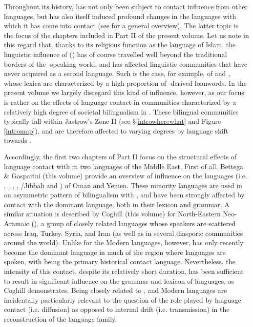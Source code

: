 \documentclass[output=paper]{langsci/langscibook}
\begin{document}
Throughout its history,  has not only been subject to contact influence from other languages, but has also itself induced profound changes in the languages with which it has come into contact (see \citealt{Versteegh2001article} for a general overview). The latter topic is the focus of the chapters included in Part II of the present volume. Let us note in this regard that, thanks to its religious function as the language of Islam, the linguistic influence of ()  has of course travelled well beyond the traditional borders of the -speaking world, and has affected linguistic communities that have never acquired  as a second language. Such is the case, for example, of  and , whose lexica are characterized by a high proportion of -derived {loanwords}. In the present volume we largely disregard this kind of influence, however, as our focus is rather on the effects of language contact in communities characterized by a relatively high degree of societal {bilingualism} in . These bilingual communities typically fall within Jastrow’s Zone II (see §\ref{introwherewhat} and Figure \ref{intromap}), and are therefore affected to varying degrees by {language shift} towards .

Accordingly, the first two chapters of Part II focus on the structural effects of language contact with  in two  languages of the Middle East. First of all, Bettega \& Gasparini (this volume) provide an overview of  influence on the  languages (i.e. , , , , /Jibbāli and ) of {Oman} and {Yemen}. These minority languages are used in an asymmetric pattern of {bilingualism} with , and have been strongly affected by contact with the dominant language, both in their lexicon and grammar. A similar situation is described by Coghill (this volume) for North-Eastern Neo-Aramaic (), a group of closely related languages whose speakers are scattered across Iraq, Turkey, Syria, and Iran (as well as in several diasporic communities around the world). Unlike for the Modern  languages, however,  has only recently become the dominant language in much of the region where  languages are spoken, with  being the primary historical contact language. Nevertheless, the intensity of this contact, despite its relatively short duration, has been sufficient to result in significant influence on the grammar and lexicon of  languages, as Coghill demonstrates. Being closely related to ,  and Modern  languages are incidentally particularly relevant to the question of the role played by language contact (i.e. {diffusion}) as opposed to internal drift (i.e. {transmission}) in the reconstruction of the  language family.
\end{document}
